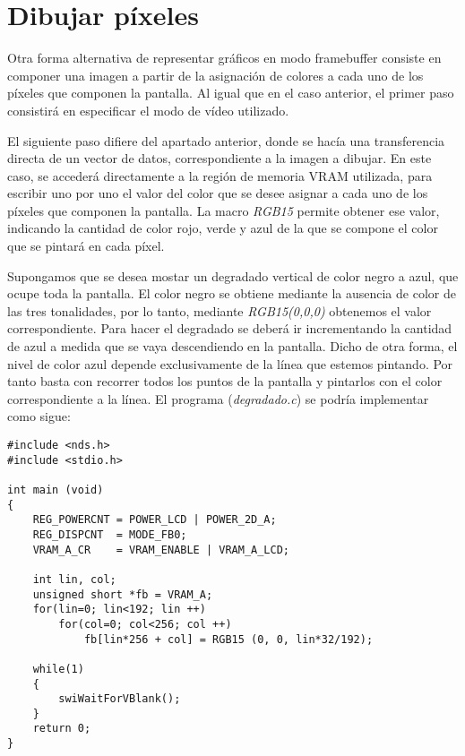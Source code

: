 \section{Dibujar píxeles}
\label{sec:p2_c3_pixeles}
Otra forma alternativa de representar gráficos en modo framebuffer consiste en componer una imagen a partir de la asignación de colores a cada uno de los píxeles que componen la pantalla. Al igual que en el caso anterior, el primer paso consistirá en especificar el modo de vídeo utilizado. 
	
El siguiente paso difiere del apartado anterior, donde se hacía una transferencia directa de un vector de datos, correspondiente a la imagen a dibujar. En este caso, se accederá directamente a la región de memoria VRAM utilizada, para escribir uno por uno el valor del color que se desee asignar a cada uno de los píxeles que componen la pantalla. La macro \textit{RGB15} permite obtener ese valor, indicando la cantidad de color rojo, verde y azul de la que se compone el color que se pintará en cada píxel.

\begin{example}
Supongamos que se desea mostar un degradado vertical de color negro a azul, que ocupe toda la pantalla. El color negro se obtiene mediante la ausencia de color de las tres tonalidades, por lo tanto, mediante \textit{RGB15(0,0,0)} obtenemos el valor correspondiente. Para hacer el degradado se deberá ir incrementando la cantidad de azul a medida que se vaya descendiendo en la pantalla. Dicho de otra forma, el nivel de color azul depende exclusivamente de la línea que estemos pintando. Por tanto basta con recorrer todos los puntos de la pantalla y pintarlos con el color correspondiente a la línea. El programa (\textit{degradado.c}) se podría implementar como sigue:
	
\begin{lstlisting}	
#include <nds.h>
#include <stdio.h>

int main (void)
{
	REG_POWERCNT = POWER_LCD | POWER_2D_A;
	REG_DISPCNT  = MODE_FB0;
	VRAM_A_CR    = VRAM_ENABLE | VRAM_A_LCD;
		
	int lin, col;
	unsigned short *fb = VRAM_A;
	for(lin=0; lin<192; lin ++)
		for(col=0; col<256; col ++)
			fb[lin*256 + col] = RGB15 (0, 0, lin*32/192);
		
	while(1)
	{
		swiWaitForVBlank();
	}
	return 0;
}	
\end{lstlisting}
\end{example}
	
